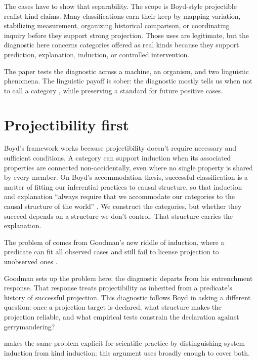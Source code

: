 \documentclass[12pt]{article}
\begin{document}
The cases have to show that separability. The scope is Boyd-style projectible
realist kind claims. Many classifications earn their keep by mapping variation,
stabilizing measurement, organizing historical comparison, or coordinating inquiry
before they support strong projection. Those uses are legitimate, but the
diagnostic here concerns categories offered as real kinds because they support
prediction, explanation, induction, or controlled intervention.

The paper tests the diagnostic across a machine, an organism, and two linguistic
phenomena. The linguistic payoff is sober: the diagnostic mostly tells us when not
to call a category , while preserving a standard for future
positive cases.

\section{Projectibility first}

Boyd's framework works because projectibility doesn't require necessary and
sufficient conditions. A category can support induction when its associated
properties are connected non-accidentally, even where no single property is shared
by every member. On Boyd's accommodation thesis, successful classification is a
matter of fitting our inferential practices to causal structure, so that induction
and explanation \enquote{always require that we accommodate our categories to the
causal structure of the world} \citep[224]{boyd1991}. We construct the categories,
but whether they succeed depends on a structure we don't control. That structure
carries the explanation.

The problem of  comes from Goodman's new riddle of
induction, where a predicate can fit all observed cases and still fail to license
projection to unobserved ones \citep{goodman1983}.

Goodman sets up the problem here; the diagnostic departs from his entrenchment
response. That response treats projectibility as inherited from a predicate's
history of successful projection. This diagnostic follows Boyd in asking a
different question: once a projection target is declared, what structure makes
the projection reliable, and what empirical tests constrain the declaration
against gerrymandering?

\textcite{jantzen2015} makes the same problem explicit for scientific practice by
distinguishing system induction from kind induction; this argument uses
 broadly enough to cover both.
\end{document}
